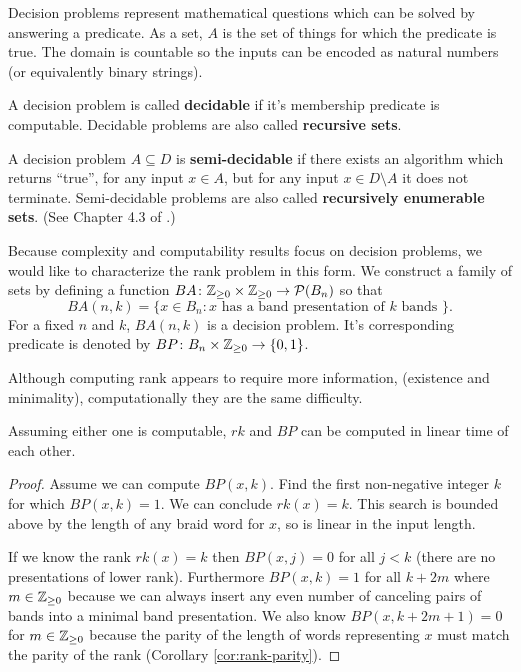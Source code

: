 \documentclass[12pt]{thesis}
\begin{document}
Decision problems represent mathematical questions which 
can be solved by answering a predicate.
As a set, $A$ is the set of things for which the predicate is true.
The domain is countable so the inputs can be encoded as natural numbers
(or equivalently binary strings).

\begin{definition}
    A decision problem is called \textbf{decidable} if it's
    membership predicate is computable.
    Decidable problems are also called \textbf{recursive sets}.
\end{definition}

\begin{definition}
    A decision problem $A \subseteq D$ is \textbf{semi-decidable} if there exists an algorithm
    which returns ``true'', for any input $x \in A$,
    but for any input $x \in D \setminus A$ it does not terminate.
    Semi-decidable problems are also called \textbf{recursively enumerable sets}.
    (See Chapter 4.3 of \cite{logical-foundations-of-math}.)
\end{definition}

Because complexity and computability results focus on decision problems,
we would like to characterize the rank problem in this form.
We construct a family of sets 
by defining a function
$BA \colon \mathbb{Z}_{\geq 0} \times \mathbb{Z}_{\geq 0} \rightarrow \mathcal{P}(B_{n})$ 
so that 
\begin{equation} 
    BA(n, k) = \{ x \in B_{n} \colon x \text{ has a band presentation of $k$ bands } \}.
\end{equation}
For a fixed $n$ and $k$,  $BA(n, k)$ is a decision problem.
It's corresponding predicate is denoted by $BP \colon B_{n} \times \mathbb{Z}_{\geq 0} \rightarrow \{ 0, 1 \}$.


Although computing rank appears to require more information,
(existence and minimality), computationally they are the same difficulty.
\begin{proposition}
    Assuming either one is computable, $rk$ and $BP$ can be computed in linear time of each other.
\end{proposition}
\begin{proof}
    Assume we can compute $BP(x, k)$.
    Find the first non-negative integer $k$ for which $BP(x, k) = 1$.
    We can conclude $rk(x) = k$.
    This search is bounded above by the length of any braid word for $x$, so is linear in the input length.

    If we know the rank $rk(x) = k$
    then $BP(x, j) = 0$ for all $j < k$ (there are no presentations of lower rank).
    Furthermore $BP(x, k) = 1$ for all $k + 2m$ where $m \in \mathbb{Z}_{\geq 0}$
    because we can always insert any even number of canceling pairs of bands into 
    a minimal band presentation.
    We also know $BP(x, k + 2m + 1) = 0$ for $m \in \mathbb{Z}_{\geq 0}$ because
    the parity of the length of words representing $x$ must
    match the parity of the rank (Corollary \ref{cor:rank-parity}).
\end{proof}
\end{document}
